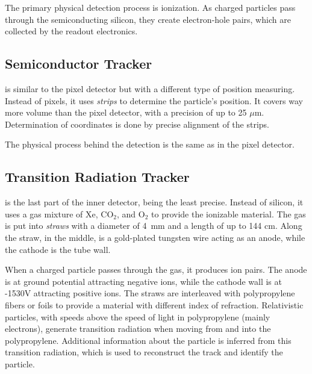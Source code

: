 The primary physical detection process is ionization.
As charged particles pass through the semiconducting silicon, they create electron-hole pairs, which are collected by the readout electronics.

\subsection{Semiconductor Tracker}
\SCT is similar to the pixel detector but with a different type of position measuring.
Instead of pixels, it uses  \emph{strips} to determine the particle's position.
It covers way more volume than the pixel detector, with a precision of up to 25 $\mu$m.
Determination of coordinates is done by precise alignment of the strips.

The physical process behind the detection is the same as in the pixel detector.

\subsection{Transition Radiation Tracker}
\TRT is the last part of the inner detector, being the least precise.
Instead of silicon, it uses a gas mixture of Xe, CO$_2$, and O$_2$ to provide the ionizable material.
The gas is put into \emph{straws} with a diameter of 4~mm and a length of up to 144 cm.
Along the straw, in the middle, is a gold-plated tungsten wire acting as an anode, while the cathode is the tube wall.

When a charged particle passes through the gas, it produces ion pairs.
The anode is at ground potential attracting negative ions, while the cathode wall is at -1530V attracting positive ions.
The straws are interleaved with polypropylene fibers or foils to provide a material with different index of refraction.
Relativistic particles, with speeds above the speed of light in polypropylene (mainly electrons), generate transition radiation when moving from and into the polypropylene. 
Additional information about the particle is inferred from this transition radiation, which is used to reconstruct the track and identify the particle. 



